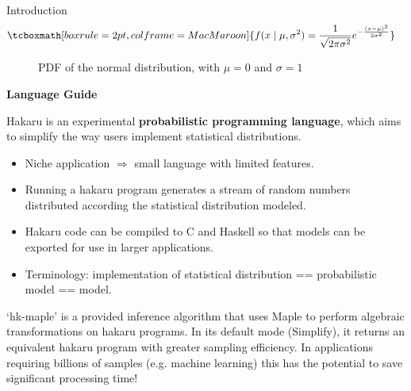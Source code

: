 \documentclass[22pt]{beamer}
\begin{document}
\begin{frame}[fragile]
\begin{textblock}{5}
\begin{block}{\Large{Introduction}}
\begin{equation*}
\begin{aligned}
& \tcboxmath[boxrule=2pt,colframe=MacMaroon]{f(x \mid \mu, \sigma^2) = \frac{1}{\sqrt{2\pi\sigma^2}} e^{-\frac{(x - \mu)^2}{2\sigma^2}}}
\end{aligned}
\end{equation*}

\begin{figure}
\caption{\tiny{PDF of the normal distribution, with $\mu = 0$ and $\sigma = 1$}}
\end{figure}

\normalsize{\textbf{Language Guide}}

\bigskip
\scriptsize{Hakaru is an experimental \textbf{probabilistic programming language}, which aims to simplify the way users implement statistical distributions. 

\begin{itemize}
    \item Niche application $\Rightarrow$ small language with limited features.
    \item Running a hakaru program generates a stream of random numbers distributed according the statistical distribution modeled.
    \item Hakaru code can be compiled to C and Haskell so that models can be exported for use in larger applications.
    \item Terminology: implementation of statistical distribution == probabilistic model == model.
\end{itemize}

}

\bigskip
\scriptsize{`hk-maple' is a provided inference algorithm that uses Maple to perform algebraic transformations on hakaru programs. In its default mode (Simplify), it returns an equivalent hakaru program with greater sampling efficiency. In applications requiring billions of samples (e.g. machine learning) this has the potential to save significant processing time!}


\end{block}
\end{textblock}
\end{frame}
\end{document}
